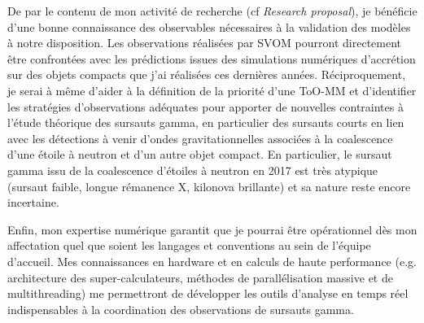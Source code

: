 \documentclass[12pt,onecolumn]{article}
\begin{document}
De par le contenu de mon activité de recherche (cf \textit{Research proposal}), je bénéficie d'une bonne connaissance des observables nécessaires à la validation des modèles à notre disposition. Les observations réalisées par SVOM pourront directement être confrontées avec les prédictions issues des simulations numériques d'accrétion sur des objets compacts que j'ai réalisées ces dernières années. Réciproquement, je serai à même d'aider à la définition de la priorité d'une ToO-MM et d'identifier les stratégies d'observations adéquates pour apporter de nouvelles contraintes à l'étude théorique des sursauts gamma, en particulier des sursauts courts en lien avec les détections à venir d'ondes gravitationnelles associées à la coalescence d'une étoile à neutron et d'un autre objet compact. En particulier, le sursaut gamma issu de la coalescence d'étoiles à neutron en 2017 est très atypique (sursaut faible, longue rémanence X, kilonova brillante) et sa nature reste encore incertaine.

Enfin, mon expertise numérique garantit que je pourrai être opérationnel dès mon affectation quel que soient les langages et conventions au sein de l'équipe d'accueil. Mes connaissances en hardware et en calculs de haute performance (e.g. architecture des super-calculateurs, méthodes de parallélisation massive et de multithreading) me permettront de développer les outils d'analyse en temps réel indispensables à la coordination des observations de sursauts gamma. 

%
%
%
%
%
%
\end{document}
